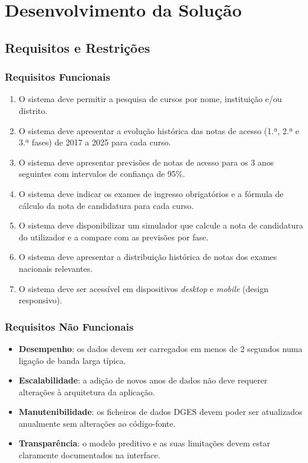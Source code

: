 \documentclass[12pt,a4paper]{article}
\begin{document}
\section{Desenvolvimento da Solução}
\label{sec:solucao}

\subsection{Requisitos e Restrições}

\subsubsection{Requisitos Funcionais}

\begin{enumerate}[noitemsep]
  \item O sistema deve permitir a pesquisa de cursos por nome, instituição e/ou distrito.
  \item O sistema deve apresentar a evolução histórica das notas de acesso (1.ª, 2.ª e 3.ª fases) de 2017 a 2025 para cada curso.
  \item O sistema deve apresentar previsões de notas de acesso para os 3 anos seguintes com intervalos de confiança de 95\%.
  \item O sistema deve indicar os exames de ingresso obrigatórios e a fórmula de cálculo da nota de candidatura para cada curso.
  \item O sistema deve disponibilizar um simulador que calcule a nota de candidatura do utilizador e a compare com as previsões por fase.
  \item O sistema deve apresentar a distribuição histórica de notas dos exames nacionais relevantes.
  \item O sistema deve ser acessível em dispositivos \textit{desktop} e \textit{mobile} (design responsivo).
\end{enumerate}

\subsubsection{Requisitos Não Funcionais}

\begin{itemize}[noitemsep]
  \item \textbf{Desempenho}: os dados devem ser carregados em menos de 2 segundos numa ligação de banda larga típica.
  \item \textbf{Escalabilidade}: a adição de novos anos de dados não deve requerer alterações à arquitetura da aplicação.
  \item \textbf{Manutenibilidade}: os ficheiros de dados DGES devem poder ser atualizados anualmente sem alterações ao código-fonte.
  \item \textbf{Transparência}: o modelo preditivo e as suas limitações devem estar claramente documentados na interface.
\end{itemize}
\end{document}
